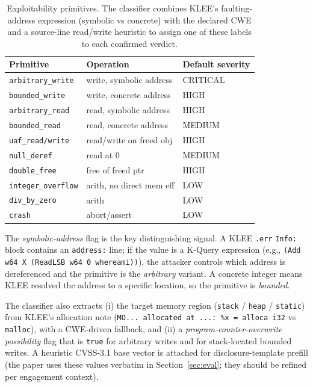 \documentclass[3p,times,procedia]{elsarticle}
\begin{document}
\begin{table}[t]
\caption{Exploitability primitives. The classifier combines KLEE's faulting-address expression (symbolic vs concrete) with the declared CWE and a source-line read/write heuristic to assign one of these labels to each confirmed verdict.}
\label{tab:prim}
\begin{tabular*}{\hsize}{@{\extracolsep{\fill}}lll@{}}
\toprule
\textbf{Primitive} & \textbf{Operation} & \textbf{Default severity} \\
\midrule
\texttt{arbitrary\_write}  & write, symbolic address  & CRITICAL \\
\texttt{bounded\_write}    & write, concrete address  & HIGH     \\
\texttt{arbitrary\_read}   & read, symbolic address   & HIGH     \\
\texttt{bounded\_read}     & read, concrete address   & MEDIUM   \\
\texttt{uaf\_read/write}   & read/write on freed obj  & HIGH     \\
\texttt{null\_deref}       & read at 0                & MEDIUM   \\
\texttt{double\_free}      & free of freed ptr        & HIGH     \\
\texttt{integer\_overflow} & arith, no direct mem eff & LOW      \\
\texttt{div\_by\_zero}     & arith                    & LOW      \\
\texttt{crash}             & abort/assert             & LOW      \\
\bottomrule
\end{tabular*}
\end{table}

The \emph{symbolic-address} flag is the key distinguishing signal. A KLEE \texttt{.err} \texttt{Info:} block contains an \texttt{address:} line; if the value is a K-Query expression (e.g., \texttt{(Add w64 X (ReadLSB w64 0 whereami))}), the attacker controls which address is dereferenced and the primitive is the \emph{arbitrary} variant. A concrete integer means KLEE resolved the address to a specific location, so the primitive is \emph{bounded}.

The classifier also extracts (i) the target memory region (\texttt{stack} / \texttt{heap} / \texttt{static}) from KLEE's allocation note (\texttt{MO... allocated at ...: \%x = alloca i32} vs \texttt{malloc}), with a CWE-driven fallback, and (ii) a \emph{program-counter-overwrite possibility} flag that is \texttt{true} for arbitrary writes and for stack-located bounded writes. A heuristic CVSS-3.1 base vector is attached for disclosure-template prefill (the paper uses these values verbatim in Section~\ref{sec:eval}; they should be refined per engagement context).
\end{document}
